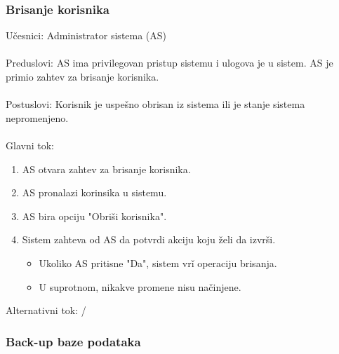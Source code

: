 \subsubsection{Brisanje korisnika}

\noindent U\v cesnici: Administrator sistema (AS)
\\
\\ Preduslovi: AS ima privilegovan pristup sistemu i ulogova je u sistem. AS je primio zahtev za brisanje korisnika.
\\
\\ Postuslovi: Korisnik je uspe\v sno obrisan iz sistema ili je stanje sistema nepromenjeno.
\\
\\ Glavni tok:
\begin{enumerate}
	\item AS otvara zahtev za brisanje korisnika.
	\item AS pronalazi korinsika u sistemu.
	\item AS bira opciju "Obri\v si korisnika".
	\item Sistem zahteva od AS da potvrdi akciju koju \v zeli da izvr\v si.
	\begin{itemize}
		\item Ukoliko AS pritisne "Da", sistem vr\v i operaciju brisanja.
		\item U suprotnom, nikakve promene nisu na\v cinjene.
	\end{itemize}
\end{enumerate}

\noindent Alternativni tok: /

\subsubsection{Back-up baze podataka}

